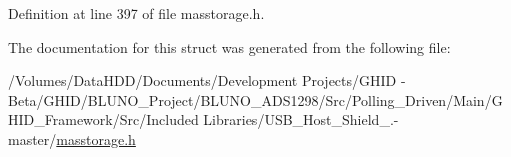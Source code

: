 \-Definition at line 397 of file masstorage.\-h.



\-The documentation for this struct was generated from the following file\-:\begin{DoxyCompactItemize}
\item 
/\-Volumes/\-Data\-H\-D\-D/\-Documents/\-Development Projects/\-G\-H\-I\-D -\/ Beta/\-G\-H\-I\-D/\-B\-L\-U\-N\-O\-\_\-\-Project/\-B\-L\-U\-N\-O\-\_\-\-A\-D\-S1298/\-Src/\-Polling\-\_\-\-Driven/\-Main/\-G\-H\-I\-D\-\_\-\-Framework/\-Src/\-Included Libraries/\-U\-S\-B\-\_\-\-Host\-\_\-\-Shield\-\_.-\/master/\hyperlink{masstorage_8h}{masstorage.\-h}\end{DoxyCompactItemize}
